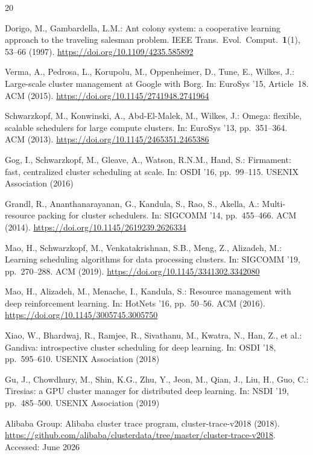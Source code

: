 \documentclass[conference]{IEEEtran}
\begin{document}
\begin{thebibliography}{20}

Dorigo, M., Gambardella, L.M.: Ant colony system: a cooperative
learning approach to the traveling salesman problem.
IEEE Trans.\ Evol.\ Comput.\ \textbf{1}(1), 53--66 (1997).
\url{https://doi.org/10.1109/4235.585892}

Verma, A., Pedrosa, L., Korupolu, M., Oppenheimer, D., Tune, E.,
Wilkes, J.: Large-scale cluster management at Google with Borg.
In: EuroSys '15, Article~18. ACM (2015).
\url{https://doi.org/10.1145/2741948.2741964}

Schwarzkopf, M., Konwinski, A., Abd-El-Malek, M., Wilkes, J.:
Omega: flexible, scalable schedulers for large compute clusters.
In: EuroSys '13, pp.\ 351--364. ACM (2013).
\url{https://doi.org/10.1145/2465351.2465386}

Gog, I., Schwarzkopf, M., Gleave, A., Watson, R.N.M., Hand, S.:
Firmament: fast, centralized cluster scheduling at scale.
In: OSDI '16, pp.\ 99--115. USENIX Association (2016)

Grandl, R., Ananthanarayanan, G., Kandula, S., Rao, S., Akella, A.:
Multi-resource packing for cluster schedulers.
In: SIGCOMM '14, pp.\ 455--466. ACM (2014).
\url{https://doi.org/10.1145/2619239.2626334}

Mao, H., Schwarzkopf, M., Venkatakrishnan, S.B., Meng, Z.,
Alizadeh, M.: Learning scheduling algorithms for data processing
clusters.
In: SIGCOMM '19, pp.\ 270--288. ACM (2019).
\url{https://doi.org/10.1145/3341302.3342080}

Mao, H., Alizadeh, M., Menache, I., Kandula, S.: Resource management
with deep reinforcement learning.
In: HotNets '16, pp.\ 50--56. ACM (2016).
\url{https://doi.org/10.1145/3005745.3005750}

Xiao, W., Bhardwaj, R., Ramjee, R., Sivathanu, M., Kwatra, N.,
Han, Z., et al.: Gandiva: introspective cluster scheduling for
deep learning.
In: OSDI '18, pp.\ 595--610. USENIX Association (2018)

Gu, J., Chowdhury, M., Shin, K.G., Zhu, Y., Jeon, M., Qian, J.,
Liu, H., Guo, C.: Tiresias: a GPU cluster manager for distributed
deep learning.
In: NSDI '19, pp.\ 485--500. USENIX Association (2019)

Alibaba Group: Alibaba cluster trace program, cluster-trace-v2018
(2018).
\url{https://github.com/alibaba/clusterdata/tree/master/cluster-trace-v2018}.
Accessed: June 2026


\end{thebibliography}
\end{document}
